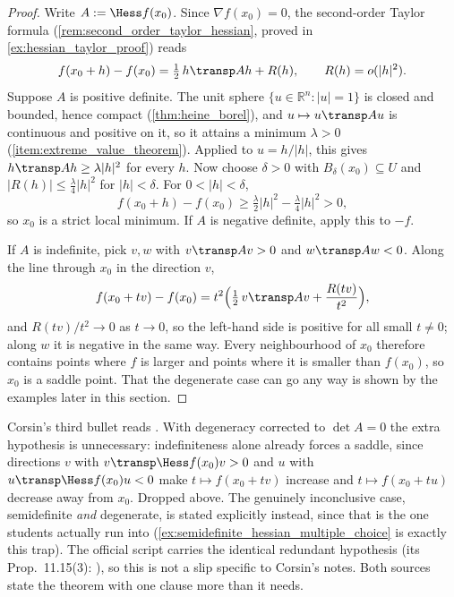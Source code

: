 \begin{proof}
Write $A := \Hess f(x_0)$. Since $\nabla f(x_0) = 0$, the second-order Taylor formula
(\cref{rem:second_order_taylor_hessian}, proved in \cref{ex:hessian_taylor_proof}) reads
\[f(x_0+h) - f(x_0) = \tfrac12\,h\transp Ah + R(h), \qquad R(h) = o(|h|^2).\]
Suppose $A$ is positive definite. The unit sphere $\{u \in \mathbb{R}^n : |u| = 1\}$ is closed
and bounded, hence compact (\cref{thm:heine_borel}), and $u \mapsto u\transp Au$ is continuous and
positive on it, so it attains a minimum $\lambda > 0$ (\cref{item:extreme_value_theorem}).
Applied to $u = h/|h|$, this gives $h\transp Ah \geq \lambda|h|^2$ for every $h$. Now choose
$\delta > 0$ with $B_\delta(x_0) \subseteq U$ and $|R(h)| \leq \tfrac{\lambda}{4}|h|^2$ for
$|h| < \delta$. For $0 < |h| < \delta$,
\[f(x_0+h) - f(x_0) \geq \tfrac{\lambda}{2}|h|^2 - \tfrac{\lambda}{4}|h|^2 > 0,\]
so $x_0$ is a strict local minimum. If $A$ is negative definite, apply this to $-f$.

If $A$ is indefinite, pick $v, w$ with $v\transp Av > 0$ and $w\transp Aw < 0$. Along the line
through $x_0$ in the direction $v$,
\[f(x_0+tv) - f(x_0) = t^2\Big(\tfrac12\,v\transp Av + \frac{R(tv)}{t^2}\Big),\]
and $R(tv)/t^2 \to 0$ as $t \to 0$, so the left-hand side is positive for all small $t \neq 0$;
along $w$ it is negative in the same way. Every neighbourhood of $x_0$ therefore contains points
where $f$ is larger and points where it is smaller than $f(x_0)$, so $x_0$ is a saddle point.
That the degenerate case can go any way is shown by the examples later in this section.
\end{proof}

\begin{ainote}
Corsin's third bullet reads . With degeneracy corrected to
$\det A = 0$ the extra hypothesis is unnecessary: indefiniteness alone already forces a saddle,
since directions $v$ with $v\transp\Hess f(x_0)v > 0$ and $u$ with $u\transp\Hess f(x_0)u < 0$
make $t\mapsto f(x_0+tv)$ increase and $t\mapsto f(x_0+tu)$ decrease away from $x_0$. Dropped
above. The genuinely inconclusive case, semidefinite \emph{and} degenerate, is stated explicitly
instead, since that is the one students actually run into (\cref{ex:semidefinite_hessian_multiple_choice} is exactly this trap).
The official script carries the identical redundant hypothesis (its Prop.\ 11.15(3):
), so this is not a slip specific to Corsin's notes. Both
sources state the theorem with one clause more than it needs.
\end{ainote}

